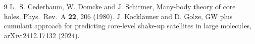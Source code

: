 \documentclass[11pt]{article}
\begin{document}


\begin{thebibliography}{9}
 L.~S. Cederbaum, W. Domcke and J. Schirmer, Many-body theory of core holes, Phys.\ Rev.\ A \textbf{22}, 206 (1980).
 J. Kockl\"auner and D. Golze, GW plus cumulant approach for predicting core-level shake-up satellites in large molecules, arXiv:2412.17132 (2024).
\end{thebibliography}
\end{document}
